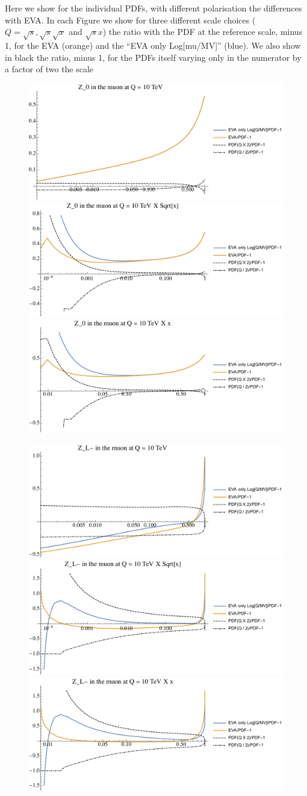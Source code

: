 \documentclass[a4paper,11pt]{article}
\begin{document}
Here we show for the individual PDFs, with different polarisation the differences with EVA. In each Figure we show for three different scale choices ($Q=\sqrt{s}, \sqrt{s} \sqrt{x}$ and $\sqrt{s} x$) the ratio with the PDF at the reference scale, minus 1, for the EVA (orange) and the ``EVA only Log[mu/MV]'' (blue). We also show in black the ratio, minus 1, for the PDFs itself varying only in the numerator by a factor of two the scale



\begin{figure}[!t]
\includegraphics[width=0.46\linewidth]{Notebooks/PlotPDFs/ratios/10TeV/Z_0_Q.pdf}
\includegraphics[width=0.46\linewidth]{Notebooks/PlotPDFs/ratios/10TeV/Z_0_Qsqrtx.pdf}
\includegraphics[width=0.46\linewidth]{Notebooks/PlotPDFs/ratios/10TeV/Z_0_Qx.pdf}
\end{figure}

\begin{figure}[!t]
\includegraphics[width=0.46\linewidth]{Notebooks/PlotPDFs/ratios/10TeV/Z_L-_Q.pdf}
\includegraphics[width=0.46\linewidth]{Notebooks/PlotPDFs/ratios/10TeV/Z_L-_Qsqrtx.pdf}
\includegraphics[width=0.46\linewidth]{Notebooks/PlotPDFs/ratios/10TeV/Z_L-_Qx.pdf}
\end{figure}
\end{document}
